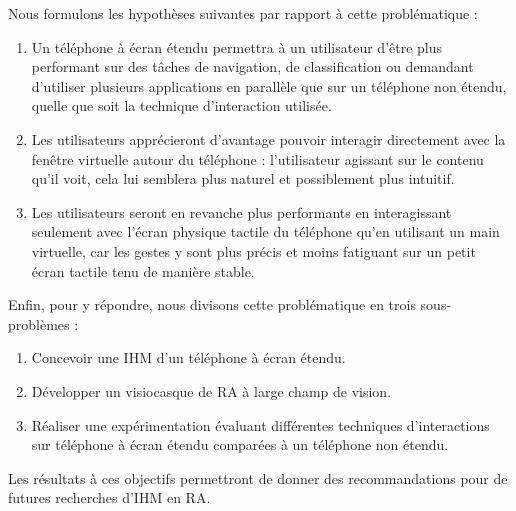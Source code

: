 Nous formulons les hypothèses suivantes par rapport à cette problématique :
\begin{enumerate}[label={(H\arabic*)}]
  \item Un téléphone à écran étendu permettra à un utilisateur d'être plus performant sur des tâches de navigation, de classification ou demandant d'utiliser plusieurs applications en parallèle que sur un téléphone non étendu, quelle que soit la technique d'interaction utilisée.
  \item Les utilisateurs apprécieront d'avantage pouvoir interagir directement avec la fenêtre virtuelle autour du téléphone : l'utilisateur agissant sur le contenu qu'il voit, cela lui semblera plus naturel et possiblement plus intuitif.
  \item Les utilisateurs seront en revanche plus performants en interagissant seulement avec l'écran physique tactile du téléphone qu'en utilisant un main virtuelle, car les gestes y sont plus précis et moins fatiguant sur un petit écran tactile tenu de manière stable.
\end{enumerate}
\medskip
 
Enfin, pour y répondre, nous divisons cette problématique en trois sous-problèmes :
\begin{enumerate}
  \item Concevoir une IHM d'un téléphone à écran étendu.
  \item Développer un visiocasque de RA à large champ de vision.
  \item Réaliser une expérimentation évaluant différentes techniques d'interactions sur téléphone à écran étendu comparées à un téléphone non étendu.
\end{enumerate}
\medskip

Les résultats à ces objectifs permettront de donner des recommandations pour de futures recherches d'IHM en RA.